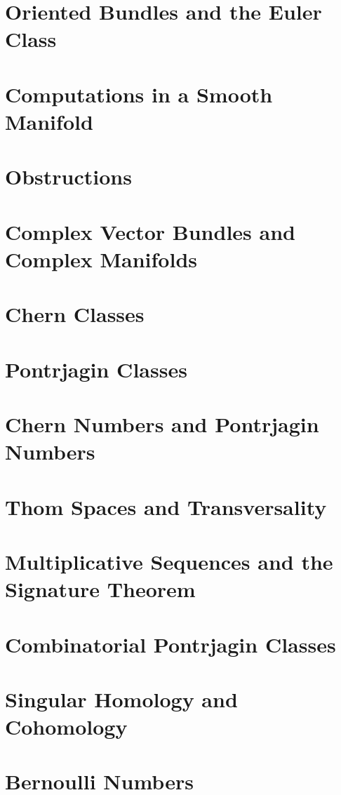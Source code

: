 \documentclass[oneside]{amsbook}
\numberwithin{prob}{chapter}
\begin{document}
\chapter{Oriented Bundles and the Euler Class}


\setcounter{chapter}{10}
\chapter{Computations in a Smooth Manifold}


\chapter{Obstructions}


\chapter{Complex Vector Bundles and Complex Manifolds}


\chapter{Chern Classes}


\chapter{Pontrjagin Classes}


\chapter{Chern Numbers and Pontrjagin Numbers}


\setcounter{chapter}{17}
\chapter{Thom Spaces and Transversality}


\chapter{Multiplicative Sequences and the Signature Theorem}


\chapter{Combinatorial Pontrjagin Classes}


\appendix
\chapter{Singular Homology and Cohomology}


\chapter{Bernoulli Numbers}

\end{document}
